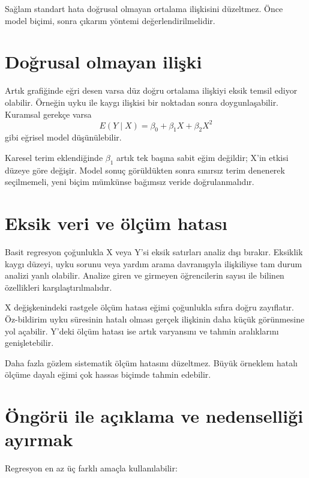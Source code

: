 Sağlam standart hata doğrusal olmayan ortalama ilişkisini düzeltmez. Önce
model biçimi, sonra çıkarım yöntemi değerlendirilmelidir.

\section{Doğrusal olmayan ilişki}

Artık grafiğinde eğri desen varsa düz doğru ortalama ilişkiyi eksik temsil
ediyor olabilir. Örneğin uyku ile kaygı ilişkisi bir noktadan sonra
doygunlaşabilir. Kuramsal gerekçe varsa
\[
E(Y\mid X)=\beta_0+\beta_1X+\beta_2X^2
\]
gibi eğrisel model düşünülebilir.

Karesel terim eklendiğinde $\beta_1$ artık tek başına sabit eğim değildir;
X'in etkisi düzeye göre değişir. Model sonuç görüldükten sonra sınırsız terim
denenerek seçilmemeli, yeni biçim mümkünse bağımsız veride doğrulanmalıdır.

\section{Eksik veri ve ölçüm hatası}

Basit regresyon çoğunlukla X veya Y'si eksik satırları analiz dışı bırakır.
Eksiklik kaygı düzeyi, uyku sorunu veya yardım arama davranışıyla ilişkiliyse
tam durum analizi yanlı olabilir. Analize giren ve girmeyen öğrencilerin
sayısı ile bilinen özellikleri karşılaştırılmalıdır.

X değişkenindeki rastgele ölçüm hatası eğimi çoğunlukla sıfıra doğru
zayıflatır. Öz-bildirim uyku süresinin hatalı olması gerçek ilişkinin daha
küçük görünmesine yol açabilir. Y'deki ölçüm hatası ise artık varyansını ve
tahmin aralıklarını genişletebilir.

\begin{mistakebox}
Daha fazla gözlem sistematik ölçüm hatasını düzeltmez. Büyük örneklem hatalı
ölçüme dayalı eğimi çok hassas biçimde tahmin edebilir.
\end{mistakebox}

\section{Öngörü ile açıklama ve nedenselliği ayırmak}

Regresyon en az üç farklı amaçla kullanılabilir:

